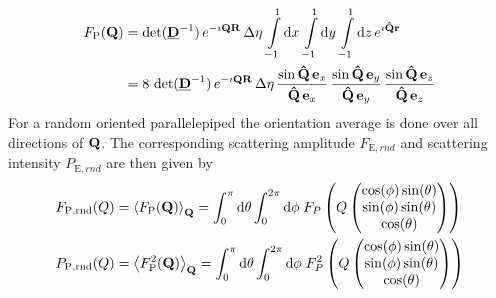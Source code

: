 \begin{align}
F_\mathrm{P}(\B{Q}) &=
\det(\M{D}^{-1})\, e^{-\imath\B{QR}}\, \Delta\eta\, \int\limits_{-1}^1
\mathrm{d}x\, \int\limits_{-1}^{1} \mathrm{d}y\, \int\limits_{-1}^{1} \mathrm{d}z\,
e^{\imath\B{\hat{Q}r}} \nonumber \\
&= \displaystyle
8\, \det(\M{D}^{-1})\, e^{-\imath\B{QR}} \,\Delta\eta\,
\frac{\sin \B{\hat{Q}}\, \B{e}_x}{\B{\hat{Q}}\, \B{e}_x}
\,
\frac{\sin \B{\hat{Q}}\, \B{e}_y}{\B{\hat{Q}}\, \B{e}_y}
\,
\frac{\sin \B{\hat{Q}}\, \B{e}_z}{\B{\hat{Q}}\, \B{e}_z}
\label{eq:form:P}
\end{align}
For a random oriented parallelepiped the orientation average is done over all directions of $\B{Q}$. The corresponding scattering amplitude $F_{\mathrm{E},rnd}$ and scattering intensity $P_{\mathrm{E},rnd}$ are then given by
\begin{align}
F_{\mathrm{P,rnd}}(Q) &= \left\langle F_\mathrm{P}(\B{Q})\right\rangle_\B{Q} = \int_0^\pi\mathrm{d}\theta \int_0^{2\pi}\mathrm{d}\phi \; F_P\left(Q\begin{pmatrix}
                                       \cos(\phi)\sin(\theta) \\
                                       \sin(\phi)\sin(\theta) \\
                                       \cos(\theta)
                                     \end{pmatrix}\right) \\
P_{\mathrm{P,rnd}}(Q) &= \left\langle F_\mathrm{P}^2(\B{Q})\right\rangle_\B{Q} = \int_0^\pi\mathrm{d}\theta \int_0^{2\pi}\mathrm{d}\phi \; F_P^2\left(Q\begin{pmatrix}
                                       \cos(\phi)\sin(\theta) \\
                                       \sin(\phi)\sin(\theta) \\
                                       \cos(\theta)
                                     \end{pmatrix}\right)
\end{align}

